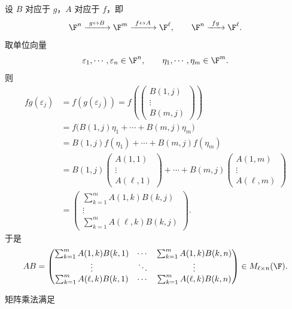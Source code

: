 \begin{definition}[矩阵的乘法]\label{p1:concept:c3-l504}
	设 $B$ 对应于 $g$，$A$ 对应于 $f$，即
	\[
	\F^n\xrightarrow{\ g\leftrightarrow B\ }\F^m
	\xrightarrow{\ f\leftrightarrow A\ }\F^\ell,
	\qquad
	\F^n\xrightarrow{\ fg\ }\F^\ell.
	\]
	取单位向量
	\[
	\varepsilon_1,\cdots,\varepsilon_n\in\F^n,
	\qquad
	\eta_1,\cdots,\eta_m\in\F^m.
	\]
	则
	\[
	\begin{aligned}
		fg(\varepsilon_j)
		&=f(g(\varepsilon_j))
		=f\left(
		\begin{pmatrix}
			B(1,j)\\ \vdots\\ B(m,j)
		\end{pmatrix}
		\right)\\
		&=f\bigl(B(1,j)\eta_1+\cdots+B(m,j)\eta_m\bigr)\\
		&=B(1,j)f(\eta_1)+\cdots+B(m,j)f(\eta_m)\\
		&=B(1,j)
		\begin{pmatrix}
			A(1,1)\\ \vdots\\ A(\ell,1)
		\end{pmatrix}
		+\cdots+
		B(m,j)
		\begin{pmatrix}
			A(1,m)\\ \vdots\\ A(\ell,m)
		\end{pmatrix}\\
		&=
		\begin{pmatrix}
			\sum_{k=1}^{m}A(1,k)B(k,j)\\
			\vdots\\
			\sum_{k=1}^{m}A(\ell,k)B(k,j)
		\end{pmatrix}.
	\end{aligned}
	\]
	于是
	\[
	AB=
	\begin{pmatrix}
		\sum_{k=1}^{m}A(1,k)B(k,1)&\cdots&\sum_{k=1}^{m}A(1,k)B(k,n)\\
		\vdots&\ddots&\vdots\\
		\sum_{k=1}^{m}A(\ell,k)B(k,1)&\cdots&\sum_{k=1}^{m}A(\ell,k)B(k,n)
	\end{pmatrix}
	\in M_{\ell\times n}(\F).
	\]

\end{definition}
	矩阵乘法满足
